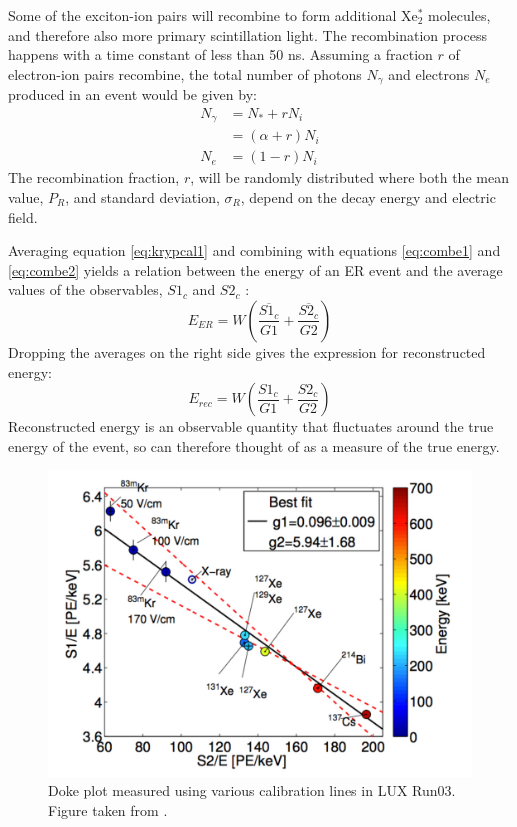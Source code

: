 Some of the exciton-ion pairs will recombine to form additional Xe$_2^*$ molecules, and therefore also more primary scintillation light. The recombination process happens with a time constant of less than 50 ns\cite{rectime}. Assuming a fraction $r$ of electron-ion pairs recombine, the total number of photons $N_{\gamma}$ and electrons $N_{e}$ produced in an event would be given by:
\begin{equation}\label{eq:combe2}
\begin{split}
N_{\gamma}&=N_*+rN_i\\
&=(\alpha+r)N_i\\
N_e&=(1-r)N_i
\end{split}
\end{equation}
The recombination fraction, $r$, will be randomly distributed where both the mean value, $P_R$, and standard deviation, $\sigma_R$, depend on the decay energy and electric field.

Averaging equation \ref{eq:krypcal1} and combining with equations \ref{eq:combe1} and \ref{eq:combe2} yields a relation between the energy of an ER event and the average values of the observables, $S1_c$ and $S2_c$ :
\begin{equation}\label{eq:combe3}
E_{ER}=W(\frac{\overline{S1_c}}{G1}+\frac{\overline{S2_c}}{G2})
\end{equation}
Dropping the averages on the right side gives the expression for reconstructed energy: 
\begin{equation}\label{eq:combe3}
E_{rec}=W(\frac{S1_c}{G1}+\frac{S2_c}{G2})
\end{equation}
Reconstructed energy is an observable quantity that fluctuates around the true energy of the event, so can therefore thought of as a measure of the true energy.
\begin{figure}[!h]
\includegraphics[width=\linewidth]{Figures/Doke_plot_run03.pdf}
\caption{Doke plot measured using various calibration lines in LUX Run03. Figure taken from \cite{attila}.}
\label{fig:lux_doke_plot} 
\end{figure}

